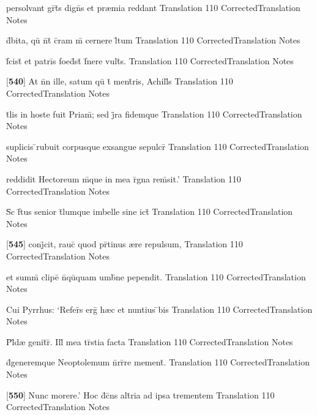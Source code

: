 \latline
  {persolvant gr\={}t\={}s dign\={}s et pr{\ae}mia reddant}
  { Translation }
  {110}
  { CorrectedTranslation }
  { Notes }


\latline
  {d\={}bita, qu\={\macron {\i}} n\={}t\={\macron {\i}} c\={}ram m\={} cernere l\={}tum}
  { Translation }
  {110}
  { CorrectedTranslation }
  { Notes }


\latline
  {f\={}cist\={\macron {\i}} et patri\={}s foed\={}st\={\macron {\i}} f\={}nere vult\={}s.}
  { Translation }
  {110}
  { CorrectedTranslation }
  { Notes }


\latline
  {[\textbf{540}] At n\={}n ille, satum qu\={} t\={} ment\={\macron {\i}}ris, Achill\={}s}
  { Translation }
  {110}
  { CorrectedTranslation }
  { Notes }


\latline
  {t\={}lis in hoste fuit Priam\={}; sed j\={}ra fidemque}
  { Translation }
  {110}
  { CorrectedTranslation }
  { Notes }


\latline
  {suplicis \={}rubuit corpusque exsangue sepulcr\={}}
  { Translation }
  {110}
  { CorrectedTranslation }
  { Notes }


\latline
  {reddidit Hectoreum m\={}que in mea r\={}gna rem\={\macron {\i}}sit.'}
  { Translation }
  {110}
  { CorrectedTranslation }
  { Notes }


\latline
  {S\={\macron {\i}}c f\={}tus senior t\={}lumque imbelle sine ict\={}}
  { Translation }
  {110}
  { CorrectedTranslation }
  { Notes }


\latline
  {[\textbf{545}] conj\={}cit, rauc\={} quod pr\={}tinus {\ae}re repulsum,}
  { Translation }
  {110}
  { CorrectedTranslation }
  { Notes }


\latline
  {et summ\={} clipe\={\macron {\i}} n\={}qu\={\macron {\i}}quam umb\={}ne pependit.}
  { Translation }
  {110}
  { CorrectedTranslation }
  { Notes }


\latline
  {Cui Pyrrhus: `Refer\={}s erg\={} h{\ae}c et nuntius \={\macron {\i}}bis}
  { Translation }
  {110}
  { CorrectedTranslation }
  { Notes }


\latline
  {P\={}l\={\macron {\i}}d{\ae} genit\={}r\={\macron {\i}}.  Ill\={\macron {\i}} mea tr\={\macron {\i}}stia facta}
  { Translation }
  {110}
  { CorrectedTranslation }
  { Notes }


\latline
  {d\={}generemque Neoptolemum n\={}rr\={}re mement\={}.}
  { Translation }
  {110}
  { CorrectedTranslation }
  { Notes }


\latline
  {[\textbf{550}] Nunc morere.'  Hoc d\={\macron {\i}}c\={}ns alt\={}ria ad ipsa trementem}
  { Translation }
  {110}
  { CorrectedTranslation }
  { Notes }


